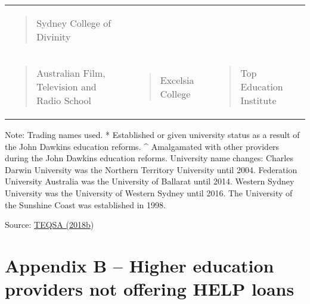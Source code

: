 \documentclass[]{book}
\begin{document}
\begin{longtable}[]{@{}lll@{}}
\begin{minipage}[t]{0.32\columnwidth}
\begin{quote}
Sydney College of Divinity
\end{quote}\strut
\end{minipage}\tabularnewline
\begin{minipage}[t]{0.32\columnwidth}\raggedright
\begin{quote}
Australian Film, Television and Radio School
\end{quote}\strut
\end{minipage} & \begin{minipage}[t]{0.32\columnwidth}\raggedright
\begin{quote}
Excelsia College
\end{quote}\strut
\end{minipage} & \begin{minipage}[t]{0.32\columnwidth}\raggedright
\begin{quote}
Top Education Institute
\end{quote}\strut
\end{minipage}\tabularnewline
\bottomrule
\end{longtable}

Note: Trading names used. * Established or given university status as a result of the John Dawkins education reforms. \^{} Amalgamated with other providers during the John Dawkins education reforms. University name changes: Charles Darwin University was the Northern Territory University until 2004. Federation University Australia was the University of Ballarat until 2014. Western Sydney University was the University of Western Sydney until 2016. The University of the Sunshine Coast was established in 1998.

Source: \protect\hyperlink{_ENREF_199}{TEQSA (2018b})

\hypertarget{appendix-b-higher-education-providers-not-offering-help-loans}{%
\chapter{Appendix B -- Higher education providers not offering HELP loans}\label{appendix-b-higher-education-providers-not-offering-help-loans}}
\end{document}
